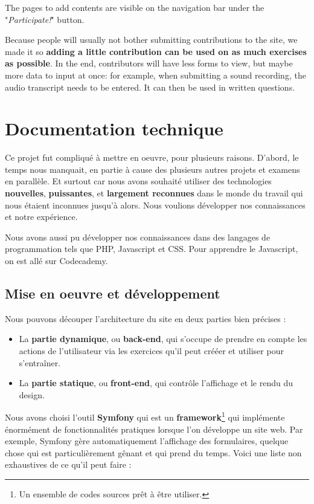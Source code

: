\documentclass[12pt,a4paper]{report}
\begin{document}
The pages to add contents are visible on the navigation bar
under the "\textit{Participate!}" button.

Because people will usually not bother submitting contributions to the site, we made it so \textbf{adding a little contribution can be used on as much exercises as possible}. In the end, contributors will have less forms to view, but maybe more data to input at once: for example, when submitting a sound recording, the audio transcript needs to be entered. It can then be used in written questions.

\pagebreak

\section{Documentation technique}

Ce projet fut compliqué à mettre en oeuvre, pour plusieurs raisons. D'abord, le temps nous manquait, en partie à cause des plusieurs autres projets et examens en parallèle. Et surtout car nous avons souhaité utiliser des technologies \textbf{nouvelles}, \textbf{puissantes}, et \textbf{largement reconnues} dans le monde du travail qui nous étaient inconnues jusqu'à alors. Nous voulions développer nos connaissances et notre expérience. 

Nous avons aussi pu développer nos connaissances dans des langages de
programmation tels que PHP\cite{php}, Javascript\cite{javascript} et
CSS\cite{css}. Pour apprendre le Javascript, on est allé sur Codecademy\cite{codecademy}.




\subsection{Mise en oeuvre et développement}

Nous pouvons découper l'architecture du site en deux parties bien précises :
\begin{itemize}
	\item La \textbf{partie dynamique}, ou \textbf{back-end}, qui s'occupe de prendre en compte les actions
	 de l'utilisateur via les exercices qu'il peut crééer et utiliser pour
	 s'entra\^iner.
	 
	 \item La \textbf{partie statique}, ou \textbf{front-end}, qui contrôle l'affichage et le rendu du design.
\end{itemize}

Nous avons choisi l'outil \textbf{Symfony}\cite{Symfony} qui est un
\textbf{framework}\footnote{Un ensemble de codes sources pr\^et à \^etre utiliser.} qui implémente énormément de fonctionnalités pratiques
lorsque l'on développe un site web. Par exemple, Symfony gère automatiquement
l'affichage des formulaires, quelque chose qui est particulièrement g\^enant et
qui prend du temps. Voici une liste non exhaustives de ce qu'il peut faire :
\end{document}
